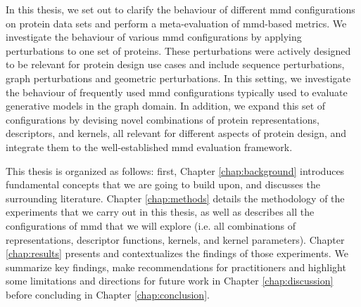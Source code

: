 In this thesis, we set out to clarify the behaviour of different \acrshort{mmd}
configurations on protein data sets and perform a meta-evaluation of
\acrshort{mmd}-based metrics. We investigate the behaviour of various
\acrshort{mmd} configurations by applying perturbations to one set of proteins.
These perturbations were actively designed to be relevant for protein design use
cases and include sequence perturbations, graph perturbations and geometric
perturbations. In this setting, we investigate the behaviour of frequently used
\acrshort{mmd} configurations typically used to evaluate generative models in
the graph domain. In addition, we expand this set of configurations by devising
novel combinations of protein representations, descriptors, and kernels, all
relevant for different aspects of protein design, and integrate them to the
well-established \acrshort{mmd} evaluation framework.

This thesis is organized as follows: first, Chapter \ref{chap:background}
introduces fundamental concepts that we are going to build upon, and discusses
the surrounding literature. Chapter \ref{chap:methods} details the methodology
of the experiments that we carry out in this thesis, as well as
describes all the configurations of \acrshort{mmd} that we will explore (i.e. all
combinations of representations, descriptor functions, kernels, and kernel
parameters). Chapter \ref{chap:results} presents and contextualizes the findings of those
experiments. We summarize key findings, make recommendations for practitioners and
highlight some limitations and directions for future work in Chapter
\ref{chap:discussion} before concluding in Chapter \ref{chap:conclusion}.





